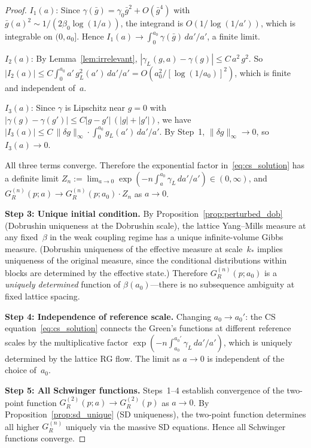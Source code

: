 \documentclass[11pt,a4paper]{article}
\theoremstyle{plain}
\theoremstyle{definition}
\theoremstyle{remark}
\begin{document}
\begin{proof}
\noindent$I_1(a)$: Since
$\gamma(\bar{g}) = \gamma_0 \bar{g}^2 + O(\bar{g}^4)$
with $\bar{g}(a)^2 \sim 1/(2\beta_0\log(1/a))$,
the integrand is $O(1/\log(1/a'))$, which is integrable
on $(0, a_0]$.  Hence $I_1(a) \to
\int_0^{a_0} \gamma(\bar{g})\,da'/a'$, a finite limit.

\noindent$I_2(a)$: By Lemma~\ref{lem:irrelevant},
$|\gamma_L(g,a) - \gamma(g)| \leq C\,a^2\,g^2$.
So $|I_2(a)| \leq C \int_0^{a_0}
a'\,g_L^2(a')\,da'/a' = O(a_0^2/[\log(1/a_0)]^2)$,
which is finite and independent of~$a$.

\noindent$I_3(a)$: Since $\gamma$ is Lipschitz near $g = 0$
with $|\gamma(g) - \gamma(g')| \leq C|g - g'|\,(|g| + |g'|)$,
we have $|I_3(a)| \leq C\,\|\delta g\|_\infty \cdot
\int_0^{a_0} g_L(a')\,da'/a'$.  By Step~1,
$\|\delta g\|_\infty \to 0$, so $I_3(a) \to 0$.

All three terms converge.  Therefore the exponential
factor in~\eqref{eq:cs_solution} has a definite limit
$Z_n := \lim_{a \to 0} \exp(-n\int_a^{a_0}\gamma_L\,da'/a')
\in (0,\infty)$,
and $G_R^{(n)}(p; a) \to G_R^{(n)}(p; a_0) \cdot Z_n$
as $a \to 0$.

\smallskip
\textbf{Step 3: Unique initial condition.}
By Proposition~\ref{prop:perturbed_dob} (Dobrushin uniqueness
at the Dobrushin scale), the lattice Yang--Mills
measure at any fixed~$\beta$ in the weak coupling regime
has a unique infinite-volume Gibbs measure.
(Dobrushin uniqueness of the effective measure at
scale~$k_*$ implies uniqueness of the original
measure, since the conditional distributions within
blocks are determined by the effective state.)
Therefore $G_R^{(n)}(p; a_0)$ is a \emph{uniquely determined}
function of $\beta(a_0)$---there is no subsequence ambiguity
at fixed lattice spacing.

\smallskip
\textbf{Step 4: Independence of reference scale.}
Changing $a_0 \to a_0'$: the CS
equation~\eqref{eq:cs_solution} connects the Green's
functions at different reference scales by the
multiplicative factor
$\exp(-n\int_{a_0}^{a_0'}\gamma_L\,da'/a')$, which is
uniquely determined by the lattice RG flow.
The limit as $a \to 0$ is
independent of the choice of~$a_0$.

\smallskip
\textbf{Step 5: All Schwinger functions.}
Steps~1--4 establish convergence of the two-point
function $G_R^{(2)}(p; a) \to G_R^{(2)}(p)$ as $a \to 0$.
By Proposition~\ref{prop:sd_unique} (SD uniqueness),
the two-point function determines all higher
$G_R^{(n)}$ uniquely via the massive SD equations.
Hence all Schwinger functions converge.


\end{proof}
\end{document}
